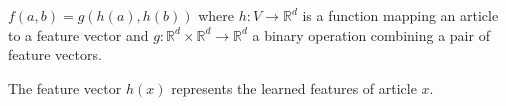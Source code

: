 $f(a,b) = g(h(a), h(b))$ where $h: V \to \mathbb{R}^d$ is a function mapping an article to a feature vector and $g: \mathbb{R}^d \times \mathbb{R}^d \to \mathbb{R}^d$ a binary operation combining a pair of feature vectors.

The feature vector $h(x)$ represents the learned features of article $x$.







